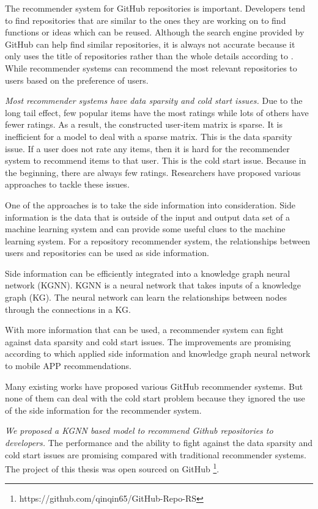 \documentclass[11pt,twoside]{report}
\begin{document}
The recommender system for GitHub repositories is important. Developers tend to find repositories that are similar to the ones they are working on to find functions or ideas which can be reused. Although the search engine provided by GitHub can help find similar repositories, it is always not accurate because it only uses the title of repositories rather than the whole details according to \cite{xu_repersp_2017}. While recommender systems can recommend the most relevant repositories to users based on the preference of users.

\textit{Most recommender systems have data sparsity and cold start issues.} Due to the long tail effect, few popular items have the most ratings while lots of others have fewer ratings. As a result, the constructed user-item matrix is sparse. It is inefficient for a model to deal with a sparse matrix. This is the data sparsity issue. If a user does not rate any items, then it is hard for the recommender system to recommend items to that user. This is the cold start issue. Because in the beginning, there are always few ratings. Researchers have proposed various approaches to tackle these issues.

One of the approaches is to take the side information \cite{jonschkowski_patterns_2016} into consideration. Side information is the data that is outside of the input and output data set of a machine learning system and can provide some useful clues to the machine learning system. For a repository recommender system, the relationships between users and repositories can be used as side information.

Side information can be efficiently integrated into a knowledge graph neural network (KGNN). KGNN is a neural network that takes inputs of a knowledge graph (KG). The neural network can learn the relationships between nodes through the connections in a KG.

With more information that can be used, a recommender system can fight against data sparsity and cold start issues. The improvements are promising according to \cite{zhang_knowledge_2020} which applied side information and knowledge graph neural network to mobile APP recommendations.

Many existing works have proposed various GitHub recommender systems. But none of them can deal with the cold start problem because they ignored the use of the side information for the recommender system.

\textit{We proposed a KGNN based model to recommend Github repositories to developers.} The performance and the ability to fight against the data sparsity and cold start issues are promising compared with traditional recommender systems. The project of this thesis was open sourced on GitHub \footnote{https://github.com/qinqin65/GitHub-Repo-RS}.
\end{document}
